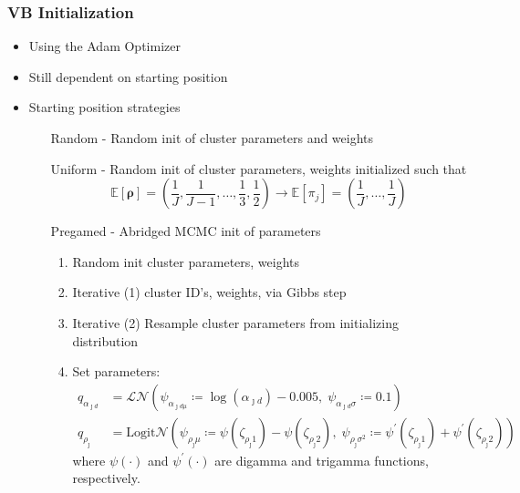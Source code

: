 \documentclass[aspectratio=169,10pt,notes]{beamer}
\begin{document}
\begin{frame}
    \frametitle{VB Initialization}
    {\footnotesize
    \begin{itemize}
        \item Using the Adam Optimizer \cite{kingma2017}
        \item Still dependent on starting position
        \item Starting position strategies
        \begin{enumerate}
            \item[Random] - Random init of cluster parameters and weights
            \item[Uniform] - Random init of cluster parameters, weights initialized such that
            \[
                \mathbb{E}[\bm{\rho}] = \left(\frac{1}{J},\frac{1}{J-1},\ldots,\frac{1}{3},\frac{1}{2}\right)
                \rightarrow \mathbb{E}[\pi_j] = \left(\frac{1}{J},\ldots,\frac{1}{J}\right)
            \]
            \item[Pregamed] - Abridged MCMC init of parameters
            \begin{enumerate}
                \item Random init cluster parameters, weights
                \item Iterative (1) cluster ID's, weights, via Gibbs step
                \item Iterative (2) Resample cluster parameters from initializing distribution
                \item Set parameters:
                \[
                \begin{aligned}
        q_{\alpha_{\jmath d}} &= 
            \mathcal{LN}\left(\psi_{\alpha_{\jmath d \mu}} 
                \coloneqq\log(\alpha_{\jmath d}) - 0.005,\; 
                \psi_{\alpha_{\jmath d}\sigma} \coloneqq0.1\right)\\
        q_{\rho_{\jmath}} &= \text{Logit}\mathcal{N}\left(
        \psi_{\rho_{\jmath}\mu} \coloneqq\psi(\zeta_{\rho_{\jmath} 1}) - \psi(\zeta_{\rho_{\jmath} 2}), \;
            \psi_{\rho_{\jmath}\sigma^2} \coloneqq\psi^{\prime}(\zeta_{\rho_{\jmath} 1}) +
                \psi^{\prime}(\zeta_{\rho_{\jmath} 2})
            \right)
        \end{aligned}   
                \]
                where $\psi(\cdot)$ and $\psi^{\prime}(\cdot)$ are 
                    digamma and trigamma functions, respectively.
            \end{enumerate}
        \end{enumerate}
    \end{itemize}
    }
\end{frame} %
\end{document}
